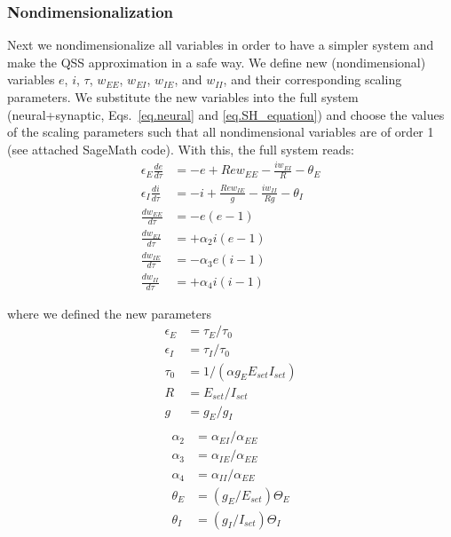 \documentclass[twocolumn]{article}
\newcommand{\EE}{\mathit{EE}}
\newcommand{\EI}{\mathit{EI}}
\newcommand{\IE}{\mathit{IE}}
\newcommand{\II}{\mathit{II}}
\newcommand{\set}{\mathit{set}}
\begin{document}
\subsubsection{Nondimensionalization}

Next we nondimensionalize all variables in order to have a simpler system and make the QSS approximation in a safe way. We define new (nondimensional) variables $e$, $i$, $\tau$, $w_{\EE}$, $w_{\EI}$, $w_{\IE}$, and $w_{\II}$, and their corresponding scaling parameters. We substitute the new variables into the full system (neural+synaptic, Eqs.\ \ref{eq.neural} and \ref{eq.SH_equation}) and choose the values of the scaling parameters such that all nondimensional variables are of order 1 (see attached SageMath code). With this, the full system reads:
\begin{equation}
\begin{aligned}
\epsilon_E \frac{de}{d\tau} & = -e + R e w_{\EE} - \frac{i w_{\EI}}{R} - \theta_E \\
\epsilon_I \frac{di}{d\tau} & = -i + \frac{R e w_{\IE}}{g} - \frac{i w_{\II}}{Rg} - \theta_I \\
\frac{dw_{\EE}}{d\tau} & = -e(e-1) \\
\frac{dw_{\EI}}{d\tau} & = +\alpha_2 i(e-1) \\
\frac{dw_{\IE}}{d\tau} & = -\alpha_3 e(i-1) \\
\frac{dw_{\II}}{d\tau} & = +\alpha_4 i(i-1)
\end{aligned}
\label{eq.SH_full_norm}
\end{equation}

\noindent where we defined the new parameters
\begin{displaymath}
\begin{aligned}
\epsilon_E & = \tau_E/\tau_0 \\
\epsilon_I & = \tau_I/\tau_0 \\
\tau_0 & = 1/(\alpha g_E E_{\set} I_{\set}) \\
R & = E_{\set}/I_{\set} \\
g & = g_E/g_I \\
\end{aligned}
\end{displaymath}
\begin{displaymath}
\begin{aligned}
\alpha_2 & = \alpha_{\EI}/\alpha_{\EE} \\
\alpha_3 & = \alpha_{\IE}/\alpha_{\EE} \\
\alpha_4 & = \alpha_{\II}/\alpha_{\EE} \\
\theta_E & = (g_E/E_{\set}) \Theta_E \\
\theta_I & = (g_I/I_{\set}) \Theta_I
\end{aligned}
\end{displaymath}
\end{document}
